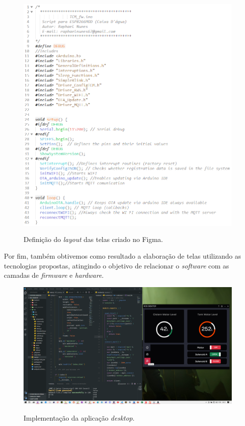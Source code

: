   
\begin{figure}[H]
	\centering
	\caption{Definição do \textit{layout} das telas criado no Figma.}
	\includegraphics[width=1\textwidth]{figuras/tcm_main.png}
	\label{fig:tcm_main}
\end{figure}


Por fim, também obtivemos como resultado a elaboração de telas utilizando as tecnologias propostas, atingindo o objetivo de relacionar o \textit{software} com as camadas de \textit{firmware} e \textit{hardware}. 

\begin{figure}[H]
	\centering
	\caption{Implementação da aplicação \textit{desktop}.}
	\includegraphics[width=1\textwidth]{figuras/rcs_desktop.png}
	\label{fig:tela_desktop}
\end{figure}


